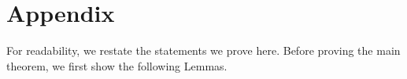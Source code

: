 \documentclass[letterpaper, 10 pt, conference]{ieeeconf}  %
\newcommand{\SWFnote}[1]{{\color{red}\boxed{\textbf{SWF:}} #1}}
\begin{document}




	
% 
% 
\appendix

\section{Appendix}
\label{sec:appendix}
For readability, we restate the statements we prove here. 
Before proving the main theorem, we first show the following Lemmas.

\end{document}

